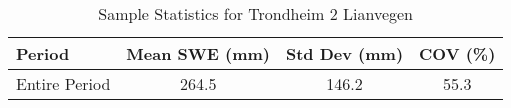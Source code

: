 
    \begin{table}[h!]
        \centering
        \caption{Sample Statistics for Trondheim 2 Lianvegen}
        \begin{tabular}{lccc} 
            \toprule
            \textbf{Period} & \textbf{Mean SWE (mm)} & \textbf{Std Dev (mm)} & \textbf{COV (\%)} \\
            \midrule
            Entire Period & 264.5 & 146.2 & 55.3 \\
            \bottomrule
        \end{tabular}
        \label{tab:sample_stats_Trondheim 2 Lianvegen}
    \end{table}
    